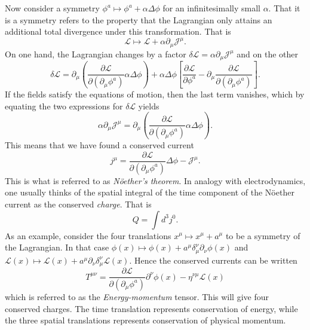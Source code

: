 \documentclass[twoside,utf8]{article}
\begin{document}
Now consider a symmetry $\phi^a \mapsto \phi^a + \alpha \Delta \phi$
for an infinitesimally small $\alpha$. That it is a symmetry refers to the property that the Lagrangian only attains an additional total divergence under this transformation. That is
\[
\mathcal{L} \mapsto \mathcal{L} + \alpha \partial_\mu \mathcal{J}^\mu.
\]
On one hand, the Lagrangian changes by a factor $\delta \mathcal{L}=\alpha \partial_\mu \mathcal{J}^\mu$ and on the other
\[
\delta \mathcal{L}
=
 \partial_\mu\left(\frac{\partial \mathcal{L}}{\partial (\partial_\mu\phi^a)}\alpha \Delta \phi \right)
+
\alpha \Delta \phi \left[\frac{\partial \mathcal{L}}{\partial \phi^a}
-  \partial_\mu\frac{\partial \mathcal{L}}{\partial(\partial_\mu\phi^a)}
\right].
\]
If the fields satisfy the equations of motion, then the last term vanishes, which by equating the two expressions for $\delta \mathcal{L}$ yields
\[
\alpha \partial_\mu \mathcal{J}^\mu = \partial_\mu\left(\frac{\partial \mathcal{L}}{\partial (\partial_\mu\phi^a)}\alpha \Delta \phi \right).
\]
This means that we have found a conserved current
\[
j^\mu = \frac{\partial \mathcal{L}}{\partial (\partial_\mu\phi^a)} \Delta \phi - \mathcal{J}^\mu.
\]
This is what is referred to as {\it N\"oether's theorem}. In analogy with electrodynamics, one usually thinks of the spatial integral of the time component of the N\"oether current as the conserved {\it charge}. That is
\[
Q = \int d^3 j^0.
\]
As an example, consider the four translations $x^\mu \mapsto x^\mu + a^\mu$ to be a symmetry of the Lagrangian. In that case $\phi(x)\mapsto \phi(x)+a^\mu \delta^\nu_\mu \partial_\nu \phi(x)$ and $\mathcal{L}(x)\mapsto \mathcal{L}(x)+a^\mu \partial_\nu \delta^\nu_\mu \mathcal{L}(x)$. Hence the conserved currents can be written
\[
T^{\mu\nu} = \frac{\partial \mathcal{L}}{\partial (\partial_\mu\phi^a)} \partial^\nu \phi(x) - \eta^{\nu\mu} \mathcal{L}(x)
\]
which is referred to as the {\it Energy-momentum} tensor. This will give four conserved charges. The time translation represents conservation of energy, while the three spatial translations represents conservation of physical momentum.


\end{document}
